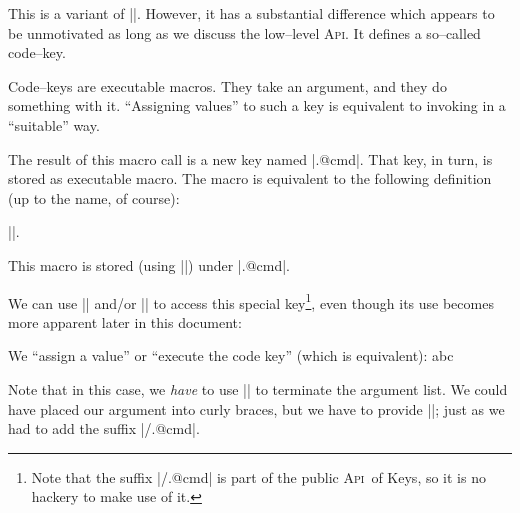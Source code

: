 \documentclass[a4paper,doc2]{ltxdoc}
\def\API{\textsc{Api}}%
\begin{document}

\begin{command}{\pgfkeysdef{}}
	This is a variant of |\pgfkeyssetvalue|. However, it has a substantial difference which appears to be unmotivated as long as we discuss the low--level \API. It defines a so--called code--key.

	Code--keys are executable macros. They take an argument, and they do something with it. ``Assigning values'' to such a key is equivalent to invoking  in a ``suitable'' way.

	The result of this macro call is a new key named |.@cmd|. That key, in turn, is stored as executable macro. The macro is equivalent to the following definition (up to the name, of course):

	|\def\macro#1\pgfeov|.

	This macro is stored (using |\pgfkeyslet|) under |.@cmd|.

	We can use |\pgfkeysgetvalue| and/or |\pgfkeysvalueof| to access this special key\footnote{Note that the suffix |/.@cmd| is part of the public \API\ of \PGF Keys, so it is no hackery to make use of it.}, even though its use becomes more apparent later in this document:

\begin{codeexample}[]
%

We ``assign a value'' or ``execute the code key'' (which is equivalent):
abc\pgfeov
\end{codeexample}
	Note that in this case, we \emph{have} to use |\pgfeov| to terminate the argument list. We could have placed our argument into curly braces, but we have to provide |\pgfeov|; just as we had to add the suffix |/.@cmd|.

\end{command}
\end{document}

